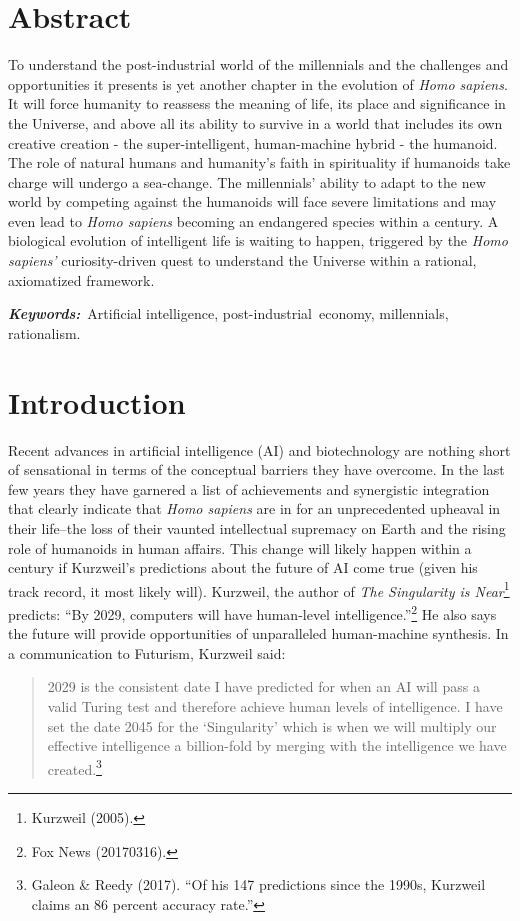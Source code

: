 \begin{multicols}{2}

\section*{Abstract}

\noindent
To understand the post-industrial world of the millennials and the challenges and opportunities it presents is yet another chapter in the evolution of \textit{Homo sapiens}. It will force humanity to reassess the meaning of life, its place and significance in the Universe, and above all its ability to survive in a world that includes its own creative creation - the super-intelligent, human-machine hybrid - the humanoid. The role of natural humans and humanity's faith in spirituality if humanoids take charge will undergo a sea-change. The millennials' ability to adapt to the new world by competing against the humanoids will face severe limitations and may even lead to \textit{Homo sapiens} becoming an endangered species within a century. A biological evolution of intelligent life is waiting to happen, triggered by the \textit{Homo sapiens’} curiosity-driven quest to understand the Universe within a rational, axiomatized framework.

\smallskip
\noindent
{\it\bfseries Keywords:}~Artificial intelligence, \hbox{post-industrial economy}, millennials, rationalism.

\section{Introduction}
\vskip -5pt

Recent advances in artificial intelligence (AI) and biotechnology are nothing short of sensational in terms of the conceptual barriers they have overcome. In the last few years they have garnered a list of achievements and synergistic integration that clearly indicate that \textit{Homo sapiens} are in for an unprecedented upheaval in their life--the loss of their vaunted intellectual supremacy on Earth and the rising role of humanoids in human affairs. This change will likely happen within a century if Kurzweil's predictions about the future of AI come true (given his track record, it most likely will). Kurzweil, the author of \textit{The Singularity is Near}\footnote{Kurzweil (2005).} predicts: “By 2029, computers will have human-level intelligence.”\footnote{Fox News (20170316).} He also says the future will provide opportunities of unparalleled human-machine synthesis. In a communication to Futurism, Kurzweil said:
\begin{quote}
2029 is the consistent date I have predicted for when an AI will pass a valid Turing test and therefore achieve human levels of intelligence. I have set the date 2045 for the `Singularity' which is when we will multiply our effective intelligence a billion-fold by merging with the intelligence we have created.\footnote{Galeon \& Reedy (2017). “Of his 147 predictions since the 1990s, Kurzweil claims an 86 percent accuracy rate.”}
\end{quote}


\end{multicols}
